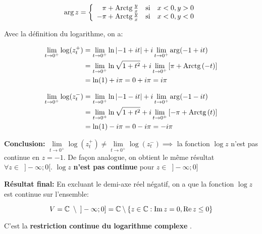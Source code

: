 \begin{example}
\begin{enumerate}[label=\arabic{enumi})]
\begin{remark}
\begin{enumerate}[label=\alph*)]
\begin{note}
    \[
    \arg z =
    \left\{
    \begin{array}{rcl}
    \pi + \textrm{Arctg}\,\frac{y}{x} & \textrm{si} & x < 0, y > 0\\
    -\pi + \textrm{Arctg}\,\frac{y}{x} & \textrm{si} & x < 0, y < 0\\
    \end{array}
    \right.
    \]
    \end{note}

    Avec la définition du logarithme, on a:
    
    \begin{align*}
    \lim\limits_{t \rightarrow 0^+} \log(z^+_t)
    &=
    \lim\limits_{t \rightarrow 0^+} \ln \left|-1 + it\right| + i \lim\limits_{t \rightarrow 0^+} \arg(-1 + it)
    \\&=
    \lim\limits_{t \rightarrow 0^+} \ln \sqrt{1 + t^2} + i \lim\limits_{t \rightarrow 0^+} \left[\pi + \textrm{Arctg}\,(-t)\right]
    \\&=
    \ln (1) + i \pi = 0 + i\pi = i\pi
    \end{align*}
    
    \begin{align*}
    \lim\limits_{t \rightarrow 0^+} \log(z^-_t)
    &=
    \lim\limits_{t \rightarrow 0^+} \ln \left|-1 - it\right| + i \lim\limits_{t \rightarrow 0^+} \arg(-1 - it)
    \\&=
    \lim\limits_{t \rightarrow 0^+} \ln \sqrt{1 + t^2} + i \lim\limits_{t \rightarrow 0^+} \left[-\pi + \textrm{Arctg}\,(t)\right]
    \\&=
    \ln (1) - i \pi = 0 - i\pi = -i\pi
    \end{align*}
    
    \textbf{Conclusion:} $\lim\limits_{t \rightarrow 0^+} \log(z^+_t) \neq \lim\limits_{t \rightarrow 0^+} \log(z^-_t) \implies$ la fonction $\log z$ n'est pas continue en $z = -1$.
    De façon analogue, on obtient le même résultat $\forall z \in \enspace ]-\infty;0[$.
    $\log z$ \textbf{n'est pas continue} pour $z \in \enspace ]-\infty;0]$
    
    \textbf{Résultat final:} En excluant le demi-axe réel négatif, on a que la fonction $\log z$ est continue sur l'ensemble:
    
    \[
    V = \mathbb{C} \enspace \setminus \enspace ]-\infty;0] = \mathbb{C} \setminus \left\{z \in \mathbb{C} : \operatorname{Im} z = 0, \operatorname{Re} z \leq 0\right\}
    \]
    
    C'est la \textbf{\og restriction continue du logarithme complexe \fg}.
    \end{enumerate}
    \end{remark}


\end{enumerate}
\end{example}
